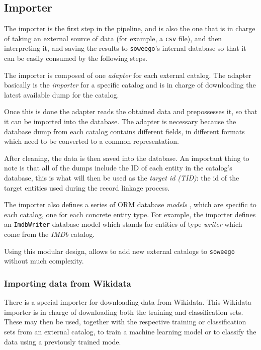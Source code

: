 \documentclass[epsfig,a4paper,11pt,titlepage,twoside,openany]{book}
\begin{document}
\subsection{Importer}
\label{sec:soweego-st-importer}

The importer is the first step in the pipeline, and is also the one that is in charge of taking an external source of data (for example, a \texttt{csv} file), and then interpreting it, and saving the results to \texttt{soweego}'s internal database so that it can be easily consumed by the following steps.

The importer is composed of one \textit{adapter} for each external catalog. The adapter basically is the \textit{importer} for a specific catalog and is in charge of downloading the latest available dump for the catalog. 


Once this is done the adapter reads the obtained data and prepossesses it, so that it can be imported into the database. The adapter is necessary because the database dump from each catalog contains different fields, in different formats which need to be converted to a common representation. 


After cleaning, the data is then saved into the database. An important thing to note is that all of the dumps include the ID of each entity in the catalog's database, this is what will then be used as the \textit{target id (TID)}: the id of the target entities used during the  record linkage process.

The importer also defines a series of ORM database \textit{models} \cite{sqlalchemy}, which are specific to each catalog, one for each concrete entity type. For example, the importer defines an \texttt{ImdbWriter} database model which stands for entities of type \textit{writer} which come from the \textit{IMDb} catalog.

Using this modular design, allows to add new external catalogs to \texttt{soweego} without much complexity.


\subsubsection{Importing data from Wikidata}
\label{sec:importing-from-wikidata}

There is a special importer for downloading data from Wikidata. This Wikidata importer is in charge of downloading both the training and classification sets. These may then be used, together with the respective training or classification sets from an external catalog, to train a machine learning model or to classify the data using a previously trained mode.
\end{document}
